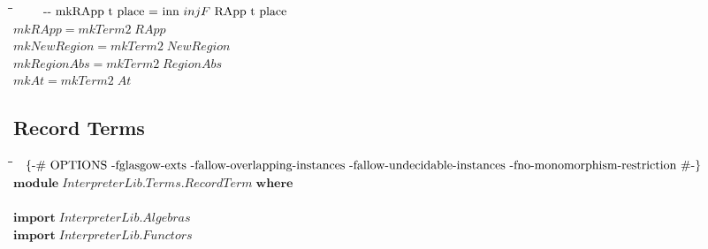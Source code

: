 \documentclass[10pt]{article}
\newlength{\lwidth}\setlength{\lwidth}{4.5cm}
\newlength{\cwidth}\setlength{\cwidth}{8mm} %
\newcommand{\Conid}[1]{\mathit{#1}}
\newcommand{\Varid}[1]{\mathit{#1}}
\begin{document}
\begin{tabbing}
\qquad\=\hspace{\lwidth}\=\hspace{\cwidth}\=\+\kill
${\mbox{\qquad-{}-  mkRApp t place = inn $ injF $ RApp t place}}$\\
${\Varid{mkRApp}\mathrel{=}\Varid{mkTerm2}\;\Conid{RApp}}$\\
${\Varid{mkNewRegion}\mathrel{=}\Varid{mkTerm2}\;\Conid{NewRegion}}$\\
${\Varid{mkRegionAbs}\mathrel{=}\Varid{mkTerm2}\;\Conid{RegionAbs}}$\\
${\Varid{mkAt}\mathrel{=}\Varid{mkTerm2}\;\Conid{At}}$
\end{tabbing}
\subsection{Record Terms}
\begin{tabbing}
\qquad\=\hspace{\lwidth}\=\hspace{\cwidth}\=\+\kill
${\mbox{\enskip\{-\# OPTIONS -fglasgow-exts -fallow-overlapping-instances -fallow-undecidable-instances -fno-monomorphism-restriction  \#-\}\enskip}}$\\
${\mathbf{module}\;\Conid{\Conid{InterpreterLib}.\Conid{Terms}.RecordTerm}\;\mathbf{where}}$\\
${}$\\
${\mathbf{import}\;\Conid{\Conid{InterpreterLib}.Algebras}}$\\
${\mathbf{import}\;\Conid{\Conid{InterpreterLib}.Functors}}$
\end{tabbing}
\end{document}

